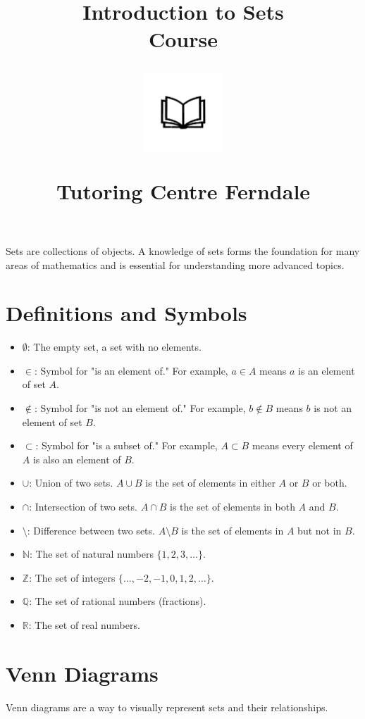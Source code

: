 \documentclass[12pt]{article}
\author{}
\date{}
\title{Introduction to Sets\\Course\\
\vspace{28pt}
\begin{center}
\includegraphics[width=4em]{ApS_logo.png}
\end{center}
\begin{normalsize}Tutoring Centre Ferndale\end{normalsize}}
\begin{document}
\maketitle

Sets are collections of objects. A knowledge of sets forms the foundation for many areas of mathematics and is essential for understanding more advanced topics.

\section{Definitions and Symbols}

\begin{itemize}
    \item \(\emptyset\): The empty set, a set with no elements.
    \item \(\in\): Symbol for "is an element of." For example, \(a \in A\) means \(a\) is an element of set \(A\).
    \item \(\notin\): Symbol for "is not an element of." For example, \(b \notin B\) means \(b\) is not an element of set \(B\).
    \item \(\subset\): Symbol for "is a subset of." For example, \(A \subset B\) means every element of \(A\) is also an element of \(B\).
    \item \(\cup\): Union of two sets. \(A \cup B\) is the set of elements in either \(A\) or \(B\) or both.
    \item \(\cap\): Intersection of two sets. \(A \cap B\) is the set of elements in both \(A\) and \(B\).
    \item \(\setminus\): Difference between two sets. \(A \setminus B\) is the set of elements in \(A\) but not in \(B\).
    \item \(\mathbb{N}\): The set of natural numbers \(\{1, 2, 3, \ldots\}\).
    \item \(\mathbb{Z}\): The set of integers \(\{\ldots, -2, -1, 0, 1, 2, \ldots\}\).
    \item \(\mathbb{Q}\): The set of rational numbers (fractions).
    \item \(\mathbb{R}\): The set of real numbers.
\end{itemize}

\newpage

\section{Venn Diagrams}

Venn diagrams are a way to visually represent sets and their relationships.
\end{document}
